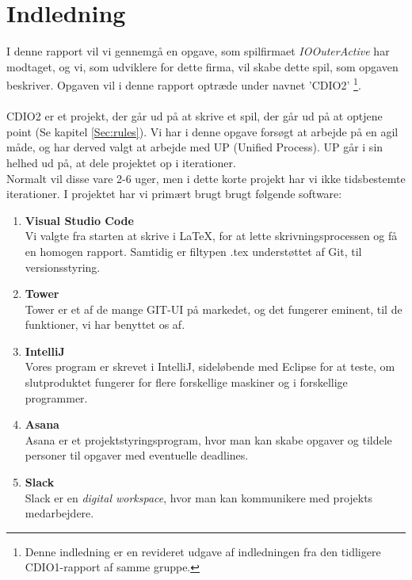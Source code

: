 \chapter{Indledning}
I denne rapport vil vi gennemgå en opgave, som spilfirmaet \textit{IOOuterActive} har modtaget, og vi, som udviklere for dette firma, vil skabe dette spil, som opgaven beskriver.
Opgaven vil i denne rapport optræde under navnet 'CDIO2' \footnote{Denne indledning er en revideret udgave af indledningen fra den tidligere CDIO1-rapport af samme gruppe.}.
\\\\CDIO2 er et projekt, der går ud på at skrive et spil, der går ud på at optjene point (Se kapitel \ref{Sec:rules}).
Vi har i denne opgave forsøgt at arbejde på en agil måde, og har derved valgt at arbejde med UP (Unified Process). 
UP går i sin helhed ud på, at dele projektet op i iterationer. 
\\ Normalt vil disse vare 2-6 uger, men i dette korte projekt har vi ikke tidsbestemte iterationer.
I projektet har vi primært brugt brugt følgende software:
\begin{enumerate}
    \item \textbf{Visual Studio Code}
    \\ Vi valgte fra starten at skrive i LaTeX, for at lette skrivningsprocessen og få en homogen rapport.
    Samtidig er filtypen .tex understøttet af Git, til versionsstyring.
    \item \textbf{Tower}
    \\Tower er et af de mange GIT-UI på markedet, og det fungerer eminent, til de funktioner, vi har benyttet os af.
    \item \textbf{IntelliJ}
    \\Vores program er skrevet i IntelliJ, sideløbende med Eclipse for at teste, om slutproduktet fungerer for flere forskellige maskiner og i forskellige programmer.
    \item \textbf{Asana}
    \\Asana er et projektstyringsprogram, hvor man kan skabe opgaver og tildele personer til opgaver med eventuelle deadlines.
    \item \textbf{Slack}
    \\Slack er en \textit{digital workspace}, hvor man kan kommunikere med projekts medarbejdere.
\end{enumerate}
